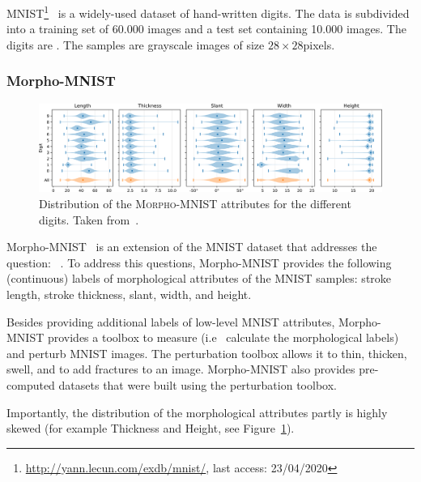MNIST\footnote{\href{http://yann.lecun.com/exdb/mnist/}{http://yann.lecun.com/exdb/mnist/}, last access: 23/04/2020}~\citep{lecun1998gradient} is a widely-used dataset of hand-written digits.
The data is subdivided into a training set of 60.000 images and a test set containing 10.000 images.
The digits are .
The samples are grayscale images of size $28\times 28$pixels.

\subsubsection{Morpho-MNIST}\label{subsubsec:morphomnist}

\begin{figure}
    \centering
    \includegraphics[width=\textwidth]{images/morpho_mnist_distribution.png}
    \caption{Distribution of the \textsc{Morpho-MNIST} attributes for the different digits. Taken from~\citep{castro2019morpho}.}
    \label{fig:morpho_mnist_distribution}
\end{figure}

Morpho-MNIST~\citep{castro2019morpho} is an extension of the MNIST dataset that addresses the question:  ~\citep{castro2019morpho}.
To address this questions, Morpho-MNIST provides the following (continuous) labels of morphological attributes of the MNIST samples: stroke length, stroke thickness, slant, width, and height.

Besides providing additional labels of low-level MNIST attributes, Morpho-MNIST provides a toolbox to measure (i.e~ calculate the morphological labels) and perturb MNIST images.
The perturbation toolbox allows it to thin, thicken, swell, and to add fractures to an image.
Morpho-MNIST also provides pre-computed datasets that were built using the perturbation toolbox.

Importantly, the distribution of the morphological attributes partly is highly skewed (for example Thickness and Height, see Figure~\ref{fig:morpho_mnist_distribution}).

